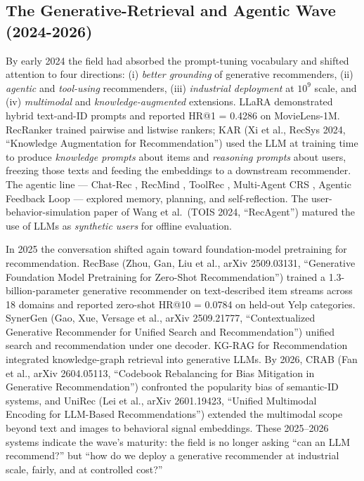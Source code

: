\documentclass{article}
\begin{document}
\subsection{The Generative-Retrieval and Agentic Wave (2024-2026)}\label{the-generative-retrieval-and-agentic-wave-2024-2026}

By early 2024 the field had absorbed the prompt-tuning vocabulary and shifted attention to four directions: (i) \emph{better grounding} of generative recommenders, (ii) \emph{agentic} and \emph{tool-using} recommenders, (iii) \emph{industrial deployment} at \(10^9\) scale, and (iv) \emph{multimodal} and \emph{knowledge-augmented} extensions. LLaRA \citep{liao2024llaralargelanguage} demonstrated hybrid text-and-ID prompts and reported HR@1 = 0.4286 on MovieLens-1M. RecRanker \citep{luo2024recrankerinstructi} trained pairwise and listwise rankers; KAR (Xi et al., RecSys 2024, ``Knowledge Augmentation for Recommendation'') used the LLM at training time to produce \emph{knowledge prompts} about items and \emph{reasoning prompts} about users, freezing those texts and feeding the embeddings to a downstream recommender. The agentic line --- Chat-Rec \citep{gao2023chatrectowardsinte}, RecMind \citep{wang2024recmindlargelangua}, ToolRec \citep{zhao2024recommendersystems}, Multi-Agent CRS \citep{fang2024amultiagentconvers}, Agentic Feedback Loop \citep{cai2024agenticfeedbackloo} --- explored memory, planning, and self-reflection. The user-behavior-simulation paper of Wang et al.~(TOIS 2024, ``RecAgent'') matured the use of LLMs as \emph{synthetic users} for offline evaluation.

In 2025 the conversation shifted again toward foundation-model pretraining for recommendation. RecBase (Zhou, Gan, Liu et al., arXiv 2509.03131, ``Generative Foundation Model Pretraining for Zero-Shot Recommendation'') trained a 1.3-billion-parameter generative recommender on text-described item streams across 18 domains and reported zero-shot HR@10 = 0.0784 on held-out Yelp categories. SynerGen (Gao, Xue, Versage et al., arXiv 2509.21777, ``Contextualized Generative Recommender for Unified Search and Recommendation'') unified search and recommendation under one decoder. KG-RAG for Recommendation \citep{wang2025knowledgegraphretr} integrated knowledge-graph retrieval into generative LLMs. By 2026, CRAB (Fan et al., arXiv 2604.05113, ``Codebook Rebalancing for Bias Mitigation in Generative Recommendation'') confronted the popularity bias of semantic-ID systems, and UniRec (Lei et al., arXiv 2601.19423, ``Unified Multimodal Encoding for LLM-Based Recommendations'') extended the multimodal scope beyond text and images to behavioral signal embeddings. These 2025--2026 systems indicate the wave's maturity: the field is no longer asking ``can an LLM recommend?'' but ``how do we deploy a generative recommender at industrial scale, fairly, and at controlled cost?''
\end{document}
